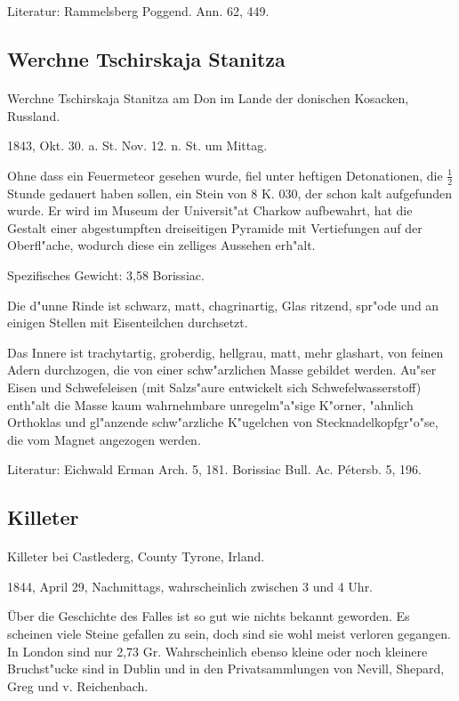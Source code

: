 \documentclass[a4paper, 11pt, oneside]{article}
\begin{document}
\footnotesize
Literatur: Rammelsberg Poggend. Ann. 62, 449.

\subsection{Werchne Tschirskaja Stanitza}
\normalsize
\paragraph{}
Werchne Tschirskaja Stanitza am Don im Lande der donischen Kosacken, Russland.

1843, Okt. 30. a. St. Nov. 12. n. St. um Mittag.

Ohne dass ein Feuermeteor gesehen wurde, fiel unter heftigen Detonationen, die $\frac{1}{2}$ Stunde gedauert haben sollen, ein Stein von 8 K. 030, der schon kalt aufgefunden wurde. Er wird im Museum der Universit"at Charkow aufbewahrt, hat die Gestalt einer abgestumpften dreiseitigen Pyramide mit Vertiefungen auf der Oberfl"ache, wodurch diese ein zelliges Aussehen erh"alt.

Spezifisches Gewicht: 3,58 Borissiac.

Die d"unne Rinde ist schwarz, matt, chagrinartig, Glas ritzend, spr"ode und an einigen Stellen mit Eisenteilchen durchsetzt.

Das Innere ist trachytartig, groberdig, hellgrau, matt, mehr glashart, von feinen Adern durchzogen, die von einer schw"arzlichen Masse gebildet werden. Au"ser Eisen und Schwefeleisen (mit Salzs"aure entwickelt sich Schwefelwasserstoff) enth"alt die Masse kaum wahrnehmbare unregelm"a"sige K"orner, "ahnlich Orthoklas und gl"anzende schw"arzliche K"ugelchen von Stecknadelkopfgr"o"se, die vom Magnet angezogen werden.

\footnotesize
Literatur: Eichwald Erman Arch. 5, 181. Borissiac Bull. Ac. Pétersb. 5, 196.

\subsection{Killeter}
\normalsize
\paragraph{}
Killeter bei Castlederg, County Tyrone, Irland.

1844, April 29, Nachmittags, wahrscheinlich zwischen 3 und 4 Uhr.

Über die Geschichte des Falles ist so gut wie nichts bekannt geworden. Es scheinen viele Steine gefallen zu sein, doch sind sie wohl meist verloren gegangen. In London sind nur 2,73 Gr. Wahrscheinlich ebenso kleine oder noch kleinere Bruchst"ucke sind in Dublin und in den Privatsammlungen von Nevill, Shepard, Greg und v. Reichenbach.
\end{document}
